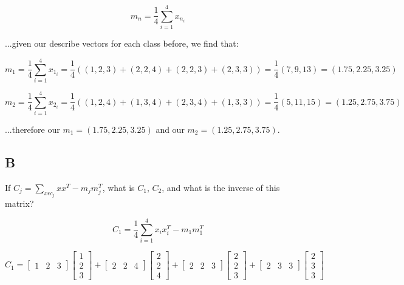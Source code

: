 \documentclass{article}
\begin{document}
\begin{equation}
    m_n = \frac{1}{4}\sum_{i=1}^4 x_{n_i}
\end{equation}

\noindent ...given our describe vectors for each class before, we find that:

\begin{equation}
    m_1 = \frac{1}{4}\sum_{i=1}^4 x_{1_i} = \frac{1}{4}((1,2,3)+(2,2,4)+(2,2,3)+(2,3,3)) = \frac{1}{4}(7,9,13)=(1.75,2.25,3.25)
\end{equation}

\begin{equation}
    m_2 = \frac{1}{4}\sum_{i=1}^4 x_{2_i} = \frac{1}{4}((1,2,4)+(1,3,4)+(2,3,4)+(1,3,3)) = \frac{1}{4}(5,11,15)=(1.25,2.75,3.75)
\end{equation}

\noindent ...therefore our $m_1=(1.75,2.25, 3.25)$ and our $m_2=(1.25,2.75,3.75)$.

\subsection*{B}

If $C_j = \sum_{x \epsilon c_j} x x^T - m_j m_j^T$, what is $C_1$, $C_2$, and what is the inverse of this matrix?

\begin{equation}
    C_1 = \frac{1}{4} \sum^4_{i=1} x_i x_i^T - m_1 m_1^T
\end{equation}

\begin{equation}
    C_1 = \begin{bmatrix}
        1 & 2 & 3
    \end{bmatrix}\begin{bmatrix}
        1 \\ 2 \\ 3
    \end{bmatrix} + 
    \begin{bmatrix}
        2 & 2 & 4
    \end{bmatrix}
    \begin{bmatrix}
        2 \\ 2 \\ 4
    \end{bmatrix} +
    \begin{bmatrix}
        2 & 2 & 3
    \end{bmatrix}
    \begin{bmatrix}
        2 \\ 2 \\ 3
    \end{bmatrix} +
    \begin{bmatrix}
        2 & 3 & 3
    \end{bmatrix}
    \begin{bmatrix}
        2 \\ 3 \\ 3
    \end{bmatrix}
\end{equation}
\end{document}
